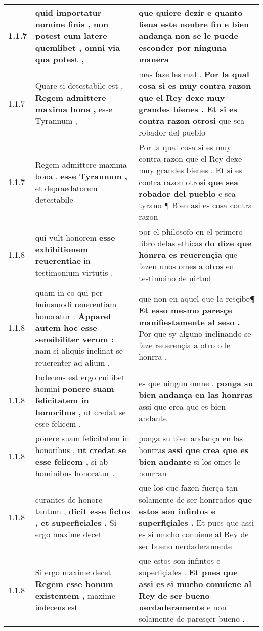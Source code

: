\begin{tabular}{|p{1cm}|p{6.5cm}|p{6.5cm}|}
1.1.7 & quid importatur nomine finis , \textbf{ non potest eum latere quemlibet , } omni via qua potest , & que quiere dezir e quanto lieua este nonbre fin \textbf{ e bien andança non se le puede esconder } por ninguna manera \\\hline
1.1.7 & Quare si detestabile est , \textbf{ Regem admittere maxima bona , } esse Tyrannum , & mas faze les mal . \textbf{ Por la qual cosa si es muy contra razon que el Rey dexe muy grandes bienes . Et si es contra razon otrosi } que sea robador del pueblo \\\hline
1.1.7 & Regem admittere maxima bona , \textbf{ esse Tyrannum , } et depraedatorem detestabile & Por la qual cosa si es muy contra razon que el Rey dexe muy grandes bienes . Et si es contra razon otrosi \textbf{ que sea robador del pueblo } e sea tyrano ¶ Bien asi es cosa contra razon \\\hline
1.1.8 & qui vult honorem \textbf{ esse exhibitionem reuerentiae } in testimonium virtutis . & por el philosofo en el primero libro delas ethicas \textbf{ do dize que honrra es reuerençia } que fazen unos omes a otros en testimoino de uirtud \\\hline
1.1.8 & quam in eo qui per huiusmodi reuerentiam honoratur . \textbf{ Apparet autem hoc esse sensibiliter verum : } nam si aliquis inclinat se reuerenter ad alium , & que non en aquel que la resçibe¶ \textbf{ Et esso mesmo paresçe manifiestamente al seso . } Por que sy alguno inclinando se faze reuerençia a otro o le honrra . \\\hline
1.1.8 & Indecens est ergo cuilibet homini \textbf{ ponere suam felicitatem in honoribus , } ut credat se esse felicem , & es que ningun omne . \textbf{ ponga su bien andança en las honrras } assi que crea que es bien andante \\\hline
1.1.8 & ponere suam felicitatem in honoribus , \textbf{ ut credat se esse felicem , } si ab hominibus honoratur . & ponga su bien andança en las honrras \textbf{ assi que crea que es bien andante } si los omes le honrran \\\hline
1.1.8 & curantes de honore tantum , \textbf{ dicit esse fictos , et superficiales . } Si ergo maxime decet & que los que fazen fuerça tan solamente de ser honrrados \textbf{ que estos son infintos e superfiçiales . } Et pues que assi es si mucho conuiene al Rey de ser bueno uerdaderamente \\\hline
1.1.8 & Si ergo maxime decet \textbf{ Regem esse bonum existentem , } maxime indecens est & que estos son infintos e superfiçiales . \textbf{ Et pues que assi es si mucho conuiene al Rey de ser bueno uerdaderamente } e non solamente de paresçer bueno . \\\hline

\end{tabular}
